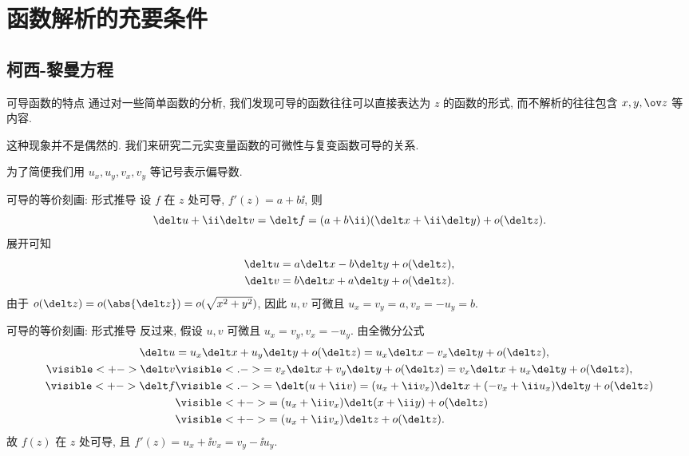 \section{函数解析的充要条件}

\subsection{柯西-黎曼方程}
\begin{frame}{可导函数的特点}
	\onslide<+->
	通过对一些简单函数的分析, 我们发现可导的函数往往可以直接表达为 $z$ 的函数的形式, 而不解析的往往包含 $x,y,\ov z$ 等内容.

	\onslide<+->
	这种现象并不是偶然的.
	\onslide<+->
	我们来研究二元实变量函数的可微性与复变函数可导的关系.

	\onslide<+->
	为了简便我们用 $u_x,u_y,v_x,v_y$ 等记号表示偏导数.
\end{frame}


\begin{frame}{可导的等价刻画: 形式推导\noexer}
	\onslide<+->
	设 \alert{$f$ 在 $z$ 处可导}, $f'(z)=a+b\ii$,
	\onslide<+->
	则
		\[
			\delt u+\ii\delt v
			=\delt f
			=(a+b\ii)(\delt x+\ii\delt y)+o(\delt z).
		\]
	\onslide<+->
	展开可知
		\begin{align*}
			\delt u&=a\delt x-b\delt y+o(\delt z),\\
			\delt v&=b\delt x+a\delt y+o(\delt z).
		\end{align*}
	\onslide<+->
	由于 $o(\delt z)=o(\abs{\delt z})=o(\sqrt{x^2+y^2})$,
	\onslide<+->
	因此 \alert{$u,v$ 可微且 $u_x=v_y=a,v_x=-u_y=b$}.
\end{frame}


\begin{frame}{可导的等价刻画: 形式推导\noexer}
	\onslide<+->
	反过来, 假设 \alert{$u,v$ 可微且 $u_x=v_y, v_x=-u_y$}.
	\onslide<+->
	由全微分公式
		\begin{align*}
			\delt u&=u_x\delt x+u_y\delt y+o(\delt z)
				=u_x\delt x-v_x\delt y+o(\delt z),\\
				\visible<+->{\delt v}&\visible<.->{=v_x\delt x+v_y\delt y+o(\delt z)
				=v_x\delt x+u_x\delt y+o(\delt z),}\\
			\visible<+->{\delt f}&
			\visible<.->{=\delt (u+\ii v)=(u_x+\ii v_x)\delt x+(-v_x+\ii u_x)\delt y+o(\delt z)}\\
			&\visible<+->{=(u_x+\ii v_x)\delt(x+\ii y)+o(\delt z)}\\
			&\visible<+->{=(u_x+\ii v_x)\delt z+o(\delt z).}
		\end{align*}
	\onslide<+->
	故 \alert{$f(z)$ 在 $z$ 处可导, 且 $f'(z)=u_x+\ii v_x=v_y-\ii u_y$}.
\end{frame}


